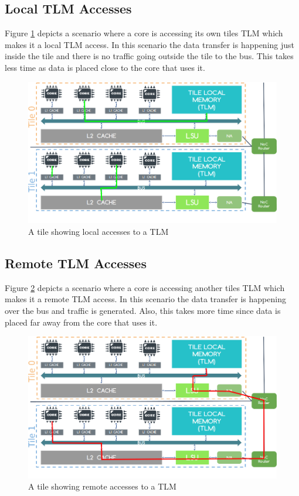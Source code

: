 \documentclass{listhesis}
\begin{document}
\subsection{Local TLM Accesses}
Figure \ref{fig:localaccesses} depicts a scenario where a core is accessing its own tiles TLM which makes it a local TLM access. In this scenario the data transfer is happening just inside the tile and there is no traffic going outside the tile to the bus. This takes less time as data is placed close to the core that uses it. 

\begin{figure}
  \includegraphics[width=\linewidth]{localaccesses.png}
  \centering
  \caption{A tile showing local accesses to a TLM}
  \label{fig:localaccesses}
\end{figure}
\subsection{Remote TLM Accesses}
Figure \ref{fig:remoteaccesses} depicts a scenario where a core is accessing another tiles TLM which makes it a remote TLM access. In this scenario the data transfer is happening over the bus and traffic is generated. Also, this takes more time since data is placed far away from the core that uses it. 

\begin{figure}
  \includegraphics[width=\linewidth]{remoteaccesses.png}
  \centering
  \caption{A tile showing remote accesses to a TLM}
  \label{fig:remoteaccesses}
\end{figure}
\end{document}
